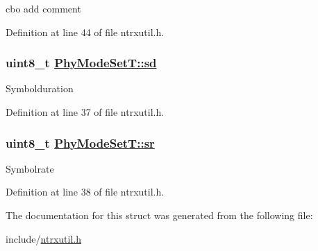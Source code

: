 cbo add comment 

Definition at line 44 of file ntrxutil.h.\hypertarget{structPhyModeSetT_f3034f48d48b2b3129886c1470e3733d}{
\subsubsection[sd]{\setlength{\rightskip}{0pt plus 5cm}uint8\_\-t \hyperlink{structPhyModeSetT_f3034f48d48b2b3129886c1470e3733d}{Phy\-Mode\-Set\-T::sd}}}
\label{structPhyModeSetT_f3034f48d48b2b3129886c1470e3733d}


Symbolduration 

Definition at line 37 of file ntrxutil.h.\hypertarget{structPhyModeSetT_a46c7440a4b3c19cf82acec549428474}{
\subsubsection[sr]{\setlength{\rightskip}{0pt plus 5cm}uint8\_\-t \hyperlink{structPhyModeSetT_a46c7440a4b3c19cf82acec549428474}{Phy\-Mode\-Set\-T::sr}}}
\label{structPhyModeSetT_a46c7440a4b3c19cf82acec549428474}


Symbolrate 

Definition at line 38 of file ntrxutil.h.

The documentation for this struct was generated from the following file:\begin{CompactItemize}
\item 
include/\hyperlink{ntrxutil_8h}{ntrxutil.h}\end{CompactItemize}
